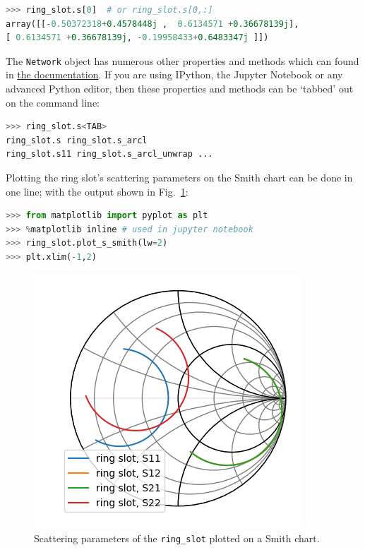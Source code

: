 \documentclass[journal, onecolumn]{IEEEtran}
\begin{document}
\begin{lstlisting}[language=Python]
>>> ring_slot.s[0]  # or ring_slot.s[0,:]
array([[-0.50372318+0.4578448j ,  0.6134571 +0.36678139j],
[ 0.6134571 +0.36678139j, -0.19958433+0.6483347j ]])
\end{lstlisting}

The \texttt{Network} object has numerous other properties and methods which can found in  \href{https://scikit-rf.readthedocs.io}{the documentation}. If you are using IPython\cite{perez2007}, the Jupyter Notebook\cite{granger2021} or any advanced Python editor, then these properties and methods can be ‘tabbed’ out on the command line:

\begin{lstlisting}[language=Python]
>>> ring_slot.s<TAB>
ring_slot.s ring_slot.s_arcl
ring_slot.s11 ring_slot.s_arcl_unwrap ...
\end{lstlisting}

Plotting the ring slot’s scattering parameters on the Smith chart can be done in one line; with the output shown in Fig.~\ref{fig:figure1}:

\begin{lstlisting}[language=Python]
>>> from matplotlib import pyplot as plt
>>> %matplotlib inline # used in jupyter notebook
>>> ring_slot.plot_s_smith(lw=2)
>>> plt.xlim(-1,2)
\end{lstlisting}

\begin{figure}
	\centering
	\includegraphics[width=0.95\linewidth]{figures/figure1}
	\caption{Scattering parameters of the \texttt{ring\_slot} plotted on a Smith chart.}
	\label{fig:figure1}
\end{figure}
\end{document}

